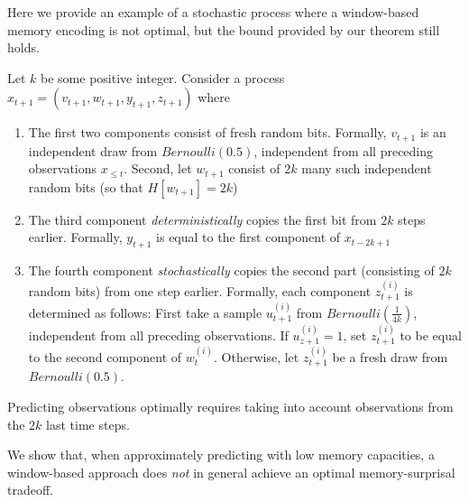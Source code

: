 \documentclass[11pt,letterpaper]{article}
\newcounter{theorem}
\begin{document}
Here we provide an example of a stochastic process where a window-based memory encoding is not optimal, but the bound provided by our theorem still holds.

Let $k$ be some positive integer.
Consider a process
$x_{t+1} = (v_{t+1}, w_{t+1}, y_{t+1}, z_{t+1})$
where
\begin{enumerate}
	\item The first two components consist of fresh random bits. Formally, $v_{t+1}$ is an independent draw from $Bernoulli(0.5)$, independent from all preceding observations $x_{\leq t}$.
		Second, let $w_{t+1}$ consist of $2k$ many such independent random bits (so that $H[w_{t+1}] = 2k$)
	\item The third component \emph{deterministically} copies the first bit from $2k$ steps earlier. Formally, $y_{t+1}$ is equal to the first component of $x_{t-2k+1}$
	\item The fourth component \emph{stochastically} copies the second part (consisting of $2k$ random bits) from one step earlier. Formally, each component $z_{t+1}^{(i)}$ is determined as follows: First take a sample $u_{t+1}^{(i)}$ from $Bernoulli(\frac{1}{4k})$, independent from all preceding observations.
		If $u_{z+1}^{(i)}=1$, set $z_{t+1}^{(i)}$ to be equal to the second component of $w_{t}^{(i)}$.
		Otherwise, let $z_{t+1}^{(i)}$ be a fresh draw from $Bernoulli(0.5)$.
\end{enumerate}

Predicting observations optimally requires taking into account observations from the $2k$ last time steps.

We show that, when approximately predicting with low memory capacities, a window-based approach does \emph{not} in general achieve an optimal memory-surprisal tradeoff.
\end{document}
